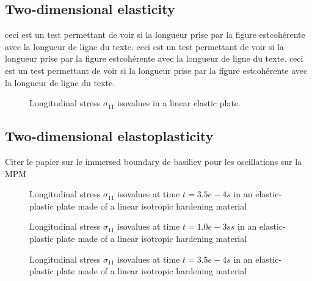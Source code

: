 \newpage
\subsection{Two-dimensional elasticity}
ceci est un test permettant de voir si la longueur prise par la figure estcohérente avec la longueur de ligne du texte. 
ceci est un test permettant de voir si la longueur prise par la figure estcohérente avec la longueur de ligne du texte. 
ceci est un test permettant de voir si la longueur prise par la figure estcohérente avec la longueur de ligne du texte. 
\begin{figure}[h!]
  \centering
  
  \caption{Longitudinal stress $\sigma_{11}$ isovalues in a linear elastic plate.}
  \label{fig:2delast_comparison1}
\end{figure}


\subsection{Two-dimensional elastoplasticity}
Citer le papier sur le immersed boundary de basiliev pour les oscillations sur la MPM

\begin{figure}[h!]
  \centering
  
  \caption{Longitudinal stress $\sigma_{11}$ isovalues at time $t=3.5e-4s$ in an elastic-plastic plate made of a linear isotropic hardening material}
  \label{fig:2dEP_comparison1}
\end{figure}

\begin{figure}[h!]
  \centering
  
  \caption{Longitudinal stress $\sigma_{11}$ isovalues at time $t=1.0e-3ss$ in an elastic-plastic plate made of a linear isotropic hardening material}
  \label{fig:2dEP_comparison2}
\end{figure}
%

\begin{figure}[h!]
  \centering
  
  \caption{Longitudinal stress $\sigma_{11}$ isovalues at time $t=3.5e-4s$ in an elastic-plastic plate made of a linear isotropic hardening material}
  \label{fig:2dEP_comparison1}
\end{figure}
